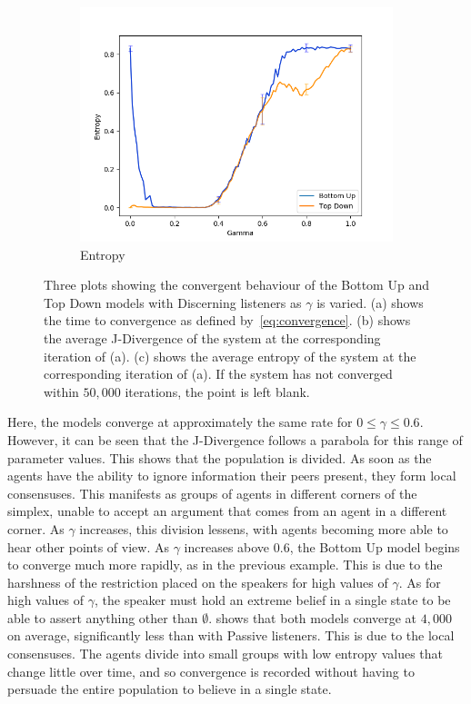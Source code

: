 \begin{figure}[h!]
\begin{subfigure}[ht]{0.45\textwidth}
    \includegraphics[width=\textwidth]{Images/Figures/BU+TD/FIE/Entropy_better.png}
    \caption{Entropy}
 \end{subfigure}

 \caption{Three plots showing the convergent behaviour of the Bottom Up and Top Down models with Discerning listeners as $\gamma$ is varied. (a) shows the time to convergence as defined by~\cref{eq:convergence}. (b) shows the average J-Divergence of the system at the corresponding iteration of (a). (c) shows the average entropy of the system at the corresponding iteration of (a). If the system has not converged within $50,000$ iterations, the point is left blank.} \label{fig:convergence_FIE}
\end{figure}



Here, the models converge at approximately the same rate for $ 0 \leq \gamma \leq 0.6$. However, it can be seen that the J-Divergence follows a parabola for this range of parameter values. This shows that the population is divided. As soon as the agents have the ability to ignore information their peers present, they form local consensuses. This manifests as groups of agents in different corners of the simplex, unable to accept an argument that comes from an agent in a different corner. As $\gamma$ increases, this division lessens, with agents becoming more able to hear other points of view. As $\gamma$ increases above $0.6$, the Bottom Up model begins to converge much more rapidly, as in the previous example. This is due to the harshness of the restriction placed on the speakers for high values of $\gamma$. As for high values of $\gamma$, the speaker must hold an extreme belief in a single state to be able to assert anything other than $\emptyset$.  shows that both models converge at $4,000$ on average, significantly less than with Passive listeners. This is due to the local consensuses. The agents divide into small groups with low entropy values that change little over time, and so convergence is recorded without having to persuade the entire population to believe in a single state.  

